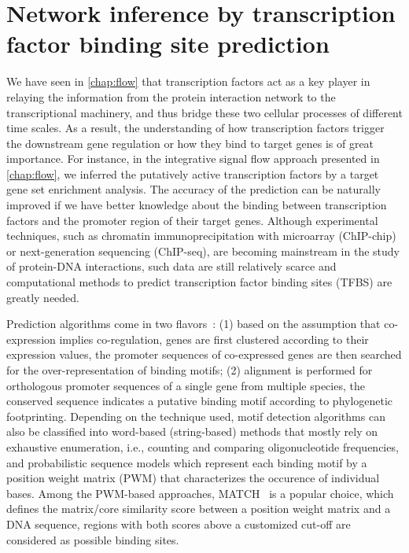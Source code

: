 \section{Network inference by transcription factor binding site prediction}
We have seen in \ref{chap:flow} that transcription factors act as a key player
in relaying the information from the protein interaction network to the
transcriptional machinery, and thus bridge these two cellular processes
of different time scales. As a result, the understanding of how transcription
factors trigger the downstream gene regulation or how they bind to target genes
is of great importance. For instance, in the integrative signal flow approach
presented in \ref{chap:flow}, we inferred the putatively active transcription
factors by a target gene set enrichment analysis. The accuracy of the prediction
can be naturally improved if we have better knowledge about
the binding between transcription factors and the 
promoter region of their target genes. 
Although experimental techniques,
such as chromatin immunoprecipitation with microarray (ChIP-chip) or 
next-generation sequencing (ChIP-seq), are becoming mainstream in the study
of protein-DNA interactions, such data are still relatively scarce and 
computational methods to predict transcription factor binding sites (TFBS) are
greatly needed. 

Prediction algorithms come in two flavors~\citep{Das2007}: 
(1) based on the
assumption that co-expression implies co-regulation, genes are 
first clustered according to their expression values, the promoter sequences
of co-expressed genes are then searched for the over-representation of 
binding motifs; (2) alignment is performed for orthologous promoter sequences of a single gene from multiple species, the conserved sequence indicates a putative
binding motif according to phylogenetic footprinting. Depending on the 
technique used, motif detection algorithms can also be classified into
word-based (string-based) methods that mostly rely on exhaustive enumeration, i.e., counting and comparing oligonucleotide frequencies, and probabilistic sequence models which
represent each binding motif by a position weight matrix (PWM) that characterizes
the occurence of individual bases.
Among the PWM-based approaches, MATCH~\citep{Kel2003} is a popular choice, which 
defines the matrix/core similarity score between a position weight matrix and
a DNA sequence, regions with both scores above a customized cut-off are considered
as possible binding sites.

